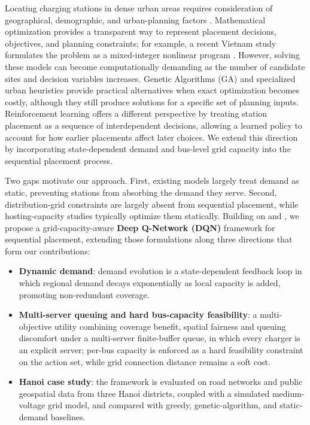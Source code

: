 \documentclass[graybox]{svmult}
\begin{document}
Locating charging stations in dense urban areas requires consideration of geographical, demographic, and urban-planning factors \cite{roblot2025deep}. Mathematical optimization provides a transparent way to represent placement decisions, objectives, and planning constraints; for example, a recent Vietnam study formulates the problem as a mixed-integer nonlinear program \cite{truc2024electric}. However, solving these models can become computationally demanding as the number of candidate sites and decision variables increases. Genetic Algorithms (GA) \cite{zhou2022location} and specialized urban heuristics \cite{torres2021electric} provide practical alternatives when exact optimization becomes costly, although they still produce solutions for a specific set of planning inputs. Reinforcement learning \cite{von2022reinforcement,liu2023optimal} offers a different perspective by treating station placement as a sequence of interdependent decisions, allowing a learned policy to account for how earlier placements affect later choices. We extend this direction by incorporating state-dependent demand and bus-level grid capacity into the sequential placement process.

Two gaps motivate our approach. First, existing models largely treat demand as static, preventing stations from absorbing the demand they serve. Second, distribution-grid constraints are largely absent from sequential placement, while hosting-capacity studies typically optimize them statically. Building on \cite{von2022reinforcement} and \cite{liu2023optimal}, we propose a grid-capacity-aware \textbf{Deep Q-Network (DQN)} framework for sequential placement, extending those formulations along three directions that form our contributions:
\begin{itemize}
\item \textbf{Dynamic demand}: demand evolution is a state-dependent feedback loop in which regional demand decays exponentially as local capacity is added, promoting non-redundant coverage.
\item \textbf{Multi-server queuing and hard bus-capacity feasibility}: a multi-objective utility combining coverage benefit, spatial fairness and queuing discomfort under a multi-server finite-buffer queue, in which every charger is an explicit server; per-bus capacity is enforced as a hard feasibility constraint on the action set, while grid connection distance remains a soft cost.
\item \textbf{Hanoi case study}: the framework is evaluated on road networks and public geospatial data from three Hanoi districts, coupled with a simulated medium-voltage grid model, and compared with greedy, genetic-algorithm, and static-demand baselines.
\end{itemize}
\end{document}
